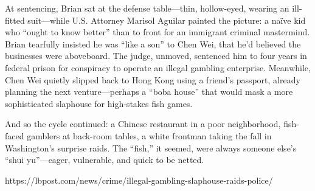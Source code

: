 At sentencing, Brian sat at the defense table—thin, hollow-eyed, wearing an ill-fitted suit—while U.S. Attorney 
Marisol Aguilar painted the picture: a naïve kid who “ought to know better” than to front for an immigrant 
criminal mastermind. Brian tearfully insisted he was “like a son” to Chen Wei, that he’d believed the 
businesses were aboveboard. The judge, unmoved, sentenced him to four years in federal prison for conspiracy 
to operate an illegal gambling enterprise. Meanwhile, Chen Wei quietly slipped back to Hong Kong using a 
friend’s passport, already planning the next venture—perhaps a “boba house” that would mask a more sophisticated 
slaphouse for high-stakes fish games.

And so the cycle continued: a Chinese restaurant in a poor neighborhood, fish-faced gamblers at back-room tables, 
a white frontman taking the fall in Washington’s surprise raids. The “fish,” it seemed, were always someone 
else's “shui yu”—eager, vulnerable, and quick to be netted.

https://lbpost.com/news/crime/illegal-gambling-slaphouse-raids-police/